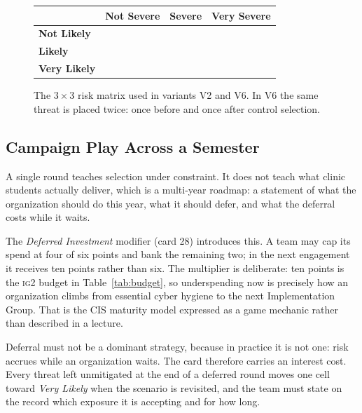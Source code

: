 \documentclass[10pt,twocolumn,letterpaper]{article}
\newcommand{\ig}[1]{\textsc{ig#1}}
\begin{document}
\begin{figure}[t]
\centering
\small
\begin{tabular}{|l|c|c|c|}
\hline
 & \textbf{Not Severe} & \textbf{Severe} & \textbf{Very Severe} \\
\hline
\textbf{Not Likely}  & \rule{0pt}{2.2em} & & \\
\hline
\textbf{Likely}      & \rule{0pt}{2.2em} & & \\
\hline
\textbf{Very Likely} & \rule{0pt}{2.2em} & & \\
\hline
\end{tabular}
\caption{The $3 \times 3$ risk matrix used in variants V2 and V6. In V6 the same
threat is placed twice: once before and once after control selection.}
\label{fig:matrix}
\end{figure}

\subsection{Campaign Play Across a Semester}
\label{sec:campaign}

A single round teaches selection under constraint. It does not teach what
clinic students actually deliver, which is a multi-year roadmap: a statement of
what the organization should do this year, what it should defer, and what the
deferral costs while it waits.

The \emph{Deferred Investment} modifier (card 28) introduces this. A team may
cap its spend at four of six points and bank the remaining two; in the next
engagement it receives ten points rather than six. The multiplier is deliberate:
ten points is the \ig{2} budget in Table~\ref{tab:budget}, so underspending now
is precisely how an organization climbs from essential cyber hygiene to the next
Implementation Group. That is the CIS maturity model expressed as a game
mechanic rather than described in a lecture.

Deferral must not be a dominant strategy, because in practice it is not one:
risk accrues while an organization waits. The card therefore carries an interest
cost. Every threat left unmitigated at the end of a deferred round moves one
cell toward \emph{Very Likely} when the scenario is revisited, and the team must
state on the record which exposure it is accepting and for how long.
\end{document}
